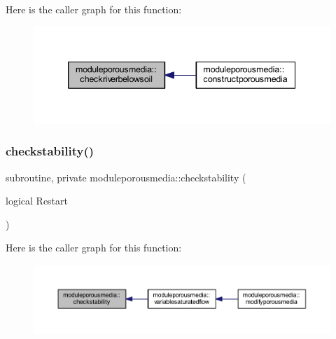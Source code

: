 Here is the caller graph for this function\+:\nopagebreak
\begin{figure}[H]
\begin{center}
\leavevmode
\includegraphics[width=339pt]{namespacemoduleporousmedia_a3f2cef78b695643e2f4662105678330c_icgraph}
\end{center}
\end{figure}
\mbox{\label{namespacemoduleporousmedia_a6005172f093c0d9ccafbe25e15b30383}} 
\subsubsection{\texorpdfstring{checkstability()}{checkstability()}}
{\footnotesize\ttfamily subroutine, private moduleporousmedia\+::checkstability (\begin{DoxyParamCaption}\item[{logical}]{Restart }\end{DoxyParamCaption})\hspace{0.3cm}{\ttfamily [private]}}

Here is the caller graph for this function\+:\nopagebreak
\begin{figure}[H]
\begin{center}
\leavevmode
\includegraphics[width=350pt]{namespacemoduleporousmedia_a6005172f093c0d9ccafbe25e15b30383_icgraph}
\end{center}
\end{figure}
\mbox{\label{namespacemoduleporousmedia_ae3a3e980159413f4ef5a35c8b4763aa6}} 
